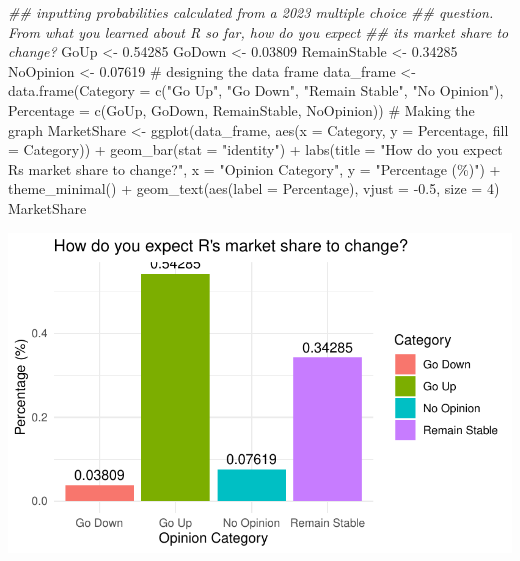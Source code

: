 \documentclass[
  letterpaper,
  DIV=11,
  numbers=noendperiod]{scrreprt}
\newenvironment{Shaded}{\begin{snugshade}}{\end{snugshade}}
\newcommand{\AttributeTok}[1]{\textcolor[rgb]{0.40,0.45,0.13}{#1}}
\newcommand{\CommentTok}[1]{\textcolor[rgb]{0.37,0.37,0.37}{#1}}
\newcommand{\DecValTok}[1]{\textcolor[rgb]{0.68,0.00,0.00}{#1}}
\newcommand{\DocumentationTok}[1]{\textcolor[rgb]{0.37,0.37,0.37}{\textit{#1}}}
\newcommand{\FloatTok}[1]{\textcolor[rgb]{0.68,0.00,0.00}{#1}}
\newcommand{\FunctionTok}[1]{\textcolor[rgb]{0.28,0.35,0.67}{#1}}
\newcommand{\NormalTok}[1]{\textcolor[rgb]{0.00,0.23,0.31}{#1}}
\newcommand{\OtherTok}[1]{\textcolor[rgb]{0.00,0.23,0.31}{#1}}
\newcommand{\SpecialCharTok}[1]{\textcolor[rgb]{0.37,0.37,0.37}{#1}}
\newcommand{\StringTok}[1]{\textcolor[rgb]{0.13,0.47,0.30}{#1}}
\begin{document}
\begin{Shaded}
\begin{Highlighting}[]
\DocumentationTok{\#\# inputting probabilities calculated from a 2023 multiple choice}
\DocumentationTok{\#\# question.  From what you learned about R so far, how do you expect}
\DocumentationTok{\#\# its market share to change?}
\NormalTok{GoUp }\OtherTok{\textless{}{-}} \FloatTok{0.54285}
\NormalTok{GoDown }\OtherTok{\textless{}{-}} \FloatTok{0.03809}
\NormalTok{RemainStable }\OtherTok{\textless{}{-}} \FloatTok{0.34285}
\NormalTok{NoOpinion }\OtherTok{\textless{}{-}} \FloatTok{0.07619}
\CommentTok{\# designing the data frame}
\NormalTok{data\_frame }\OtherTok{\textless{}{-}} \FunctionTok{data.frame}\NormalTok{(}\AttributeTok{Category =} \FunctionTok{c}\NormalTok{(}\StringTok{"Go Up"}\NormalTok{, }\StringTok{"Go Down"}\NormalTok{, }\StringTok{"Remain Stable"}\NormalTok{,}
    \StringTok{"No Opinion"}\NormalTok{), }\AttributeTok{Percentage =} \FunctionTok{c}\NormalTok{(GoUp, GoDown, RemainStable, NoOpinion))}
\CommentTok{\# Making the graph}
\NormalTok{MarketShare }\OtherTok{\textless{}{-}} \FunctionTok{ggplot}\NormalTok{(data\_frame, }\FunctionTok{aes}\NormalTok{(}\AttributeTok{x =}\NormalTok{ Category, }\AttributeTok{y =}\NormalTok{ Percentage, }\AttributeTok{fill =}\NormalTok{ Category)) }\SpecialCharTok{+}
    \FunctionTok{geom\_bar}\NormalTok{(}\AttributeTok{stat =} \StringTok{"identity"}\NormalTok{) }\SpecialCharTok{+} \FunctionTok{labs}\NormalTok{(}\AttributeTok{title =} \StringTok{"How do you expect R\textquotesingle{}s market share to change?"}\NormalTok{,}
    \AttributeTok{x =} \StringTok{"Opinion Category"}\NormalTok{, }\AttributeTok{y =} \StringTok{"Percentage (\%)"}\NormalTok{) }\SpecialCharTok{+} \FunctionTok{theme\_minimal}\NormalTok{() }\SpecialCharTok{+} \FunctionTok{geom\_text}\NormalTok{(}\FunctionTok{aes}\NormalTok{(}\AttributeTok{label =}\NormalTok{ Percentage),}
    \AttributeTok{vjust =} \SpecialCharTok{{-}}\FloatTok{0.5}\NormalTok{, }\AttributeTok{size =} \DecValTok{4}\NormalTok{)}
\NormalTok{MarketShare}
\end{Highlighting}
\end{Shaded}

\includegraphics{dataviz_files/figure-pdf/unnamed-chunk-5-1.pdf}
\end{document}
